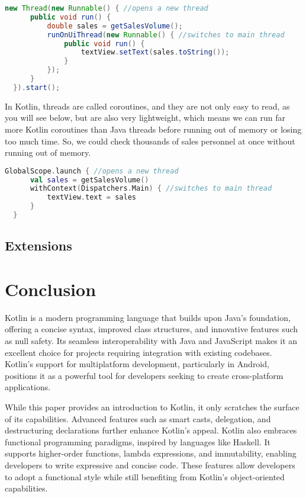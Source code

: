 \documentclass[a4paper, 11pt]{article}
\begin{document}
  \begin{lstlisting}[language=Java, title={Java Background Threads}]
  new Thread(new Runnable() { //opens a new thread
      public void run() {
          double sales = getSalesVolume();
          runOnUiThread(new Runnable() { //switches to main thread
              public void run() {
                  textView.setText(sales.toString());
              }
          });
      }
  }).start();
  \end{lstlisting}
  In Kotlin, threads are called coroutines, and they are not only easy to read, as you will see below, but are also very lightweight, which means we can run far more Kotlin coroutines than Java threads before running out of memory or losing too much time.
  So, we could check thousands of sales personnel at once without running out of memory.
  \begin{lstlisting}[language = Kotlin, title = Kotlin Coroutines]
  GlobalScope.launch { //opens a new thread
      val sales = getSalesVolume() 
      withContext(Dispatchers.Main) { //switches to main thread
          textView.text = sales 
      }
  }
  \end{lstlisting}

\subsection{Extensions}


\section{Conclusion}
Kotlin is a modern programming language that builds upon Java's foundation, offering a concise syntax, improved class structures, and innovative features such as null safety. Its seamless interoperability with Java and JavaScript makes it an excellent choice for projects requiring integration with existing codebases. Kotlin's support for multiplatform development, particularly in Android, positions it as a powerful tool for developers seeking to create cross-platform applications.

While this paper provides an introduction to Kotlin, it only scratches the surface of its capabilities. Advanced features such as smart casts, delegation, and destructuring declarations further enhance Kotlin's appeal.
Kotlin also embraces functional programming paradigms, inspired by languages like Haskell. It supports higher-order functions, lambda expressions, and immutability, enabling developers to write expressive and concise code. These features allow developers to adopt a functional style while still benefiting from Kotlin's object-oriented capabilities.
\end{document}
